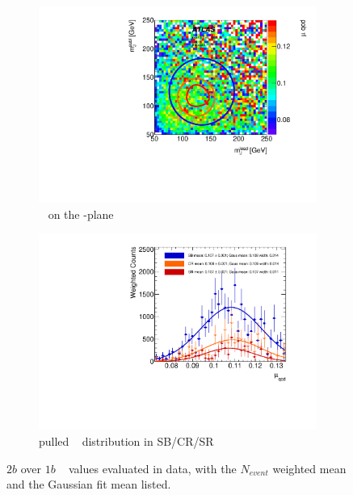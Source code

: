 \begin{figure}[htbp!]
\centering
\captionsetup{justification=centering}
	\hspace{-1cm}
    \begin{subfigure}[b]{0.4\textwidth}
        \includegraphics[width=\textwidth,angle=-90]{figures/boosted/AppendixMuqcdstudy/TwoTag_Incl_mH0H1.pdf}
        \caption{\muqcd~ on the \mleadJ-\msublJ plane}
        \label{fig:app-muqcd-2b-2d}
    \end{subfigure}
    \quad \quad \quad \quad 
    \begin{subfigure}[b]{0.4\textwidth}
        \includegraphics[width=\textwidth,angle=-90]{figures/boosted/AppendixMuqcdstudy/TwoTag_Incl_mH0H1_pull.pdf}
        \caption{pulled \muqcd~ distribution in SB/CR/SR}
        \label{fig:app-muqcd-2b-pull}
    \end{subfigure}
\caption{$2b$ over $1b$ \muqcd~ values evaluated in data, with the $N_{event}$ weighted mean and the Gaussian fit mean listed.}
\label{fig:app-muqcd-2b}
\end{figure}


